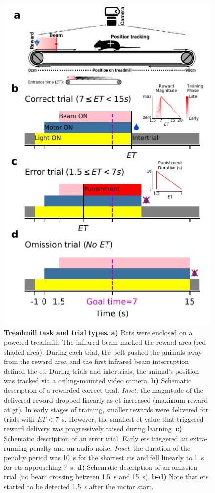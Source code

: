 \begin{figure}[bt!]
  \begin{center}
    \includegraphics[width=.5\linewidth]{ch-methods/figures/TaskRulesFULL.pdf}
    \caption[Treadmill Task]
        {\textbf{Treadmill task and trial types.}
        \textbf{a)}
        Rats were enclosed on a powered treadmill. 
        The infrared beam marked the reward area (red shaded area).
        During each trial, the belt pushed the animals away from the reward area and the first infrared beam interruption defined the \gls{et}.
        During trials and intertrials, the animal's position was tracked via a ceiling-mounted video camera.
        \textbf{b)}
        Schematic description of a rewarded correct trial.
            \textit{Inset}: the magnitude of the delivered reward dropped linearly as \gls{et} increased (maximum reward at \acrlong{gt}).
            In early stages of training, smaller rewards were delivered for trials with $ET<7$~s.
            However, the smallest \gls{et} value that triggered reward delivery was progressively raised during learning.
        \textbf{c)}
        Schematic description of an error trial.
        Early \glspl{et} triggered an extra-running penalty and an audio noise.
            \textit{Inset}: the duration of the penalty period was 10~s for the shortest \glspl{et} and fell linearly to 1~s for \glspl{et} approaching 7~s.
        \textbf{d)}
        Schematic description of an omission trial (no beam crossing between 1.5~s and 15~s).
        \textbf{b-d)}
        Note that \glspl{et} started to be detected 1.5~s after the motor start. 
    }
    \label{fig:methods:taskRules}
  \end{center}
\end{figure}